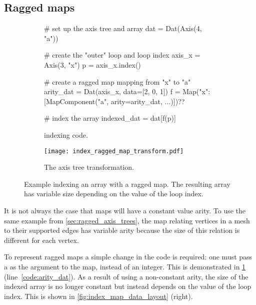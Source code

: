 \documentclass[thesis]{subfiles}
\begin{document}
\subsection{Ragged maps}
\label{sec:indexing_ragged_maps}

\begin{figure}
  \centering

  \begin{subfigure}{.9\textwidth}
    \begin{pyalg2}
      # set up the axis tree and array
      dat = Dat(Axis(4, "a"))

      # create the "outer" loop and loop index
      axis_x = Axis(3, "x")
      p = axis_x.index()

      # create a ragged map mapping from "x" to "a"
      arity_dat = Dat(axis_x, data=[2, 0, 1])
      f = Map({"x": [MapComponent("a", arity=arity_dat, ...)]})?\label{code:arity_dat}?

      # index the array
      indexed_dat = dat[f(p)]
    \end{pyalg2}

    \caption{ indexing code.}
    \label{fig:index_ragged_map_code}
  \end{subfigure}

  \vspace{1em}

  \begin{subfigure}{\textwidth}
    \centering
    \texttt{[image: index\_ragged\_map\_transform.pdf]}
    \caption{The axis tree transformation.}
    \label{fig:index_ragged_map_transform}
  \end{subfigure}

  \caption{
    Example indexing an array with a ragged map.
    The resulting array has variable size depending on the value of the loop index.
  }
  \label{fig:index_ragged_map}
\end{figure}

It is not always the case that maps will have a constant value arity.
To use the same example from \cref{sec:ragged_axis_trees}, the map relating vertices in a mesh to their supported edges has variable arity because the size of this relation is different for each vertex.

To represent ragged maps a simple change in the code is required: one must pass a  as the  argument to the map, instead of an integer.
This is demonstrated in \cref{fig:index_ragged_map_code} (line~\ref{code:arity_dat}).
As a result of using a non-constant arity, the size of the indexed array is no longer constant but instead depends on the value of the loop index.
This is shown in \cref{fig:index_map_data_layout} (right).
\end{document}
